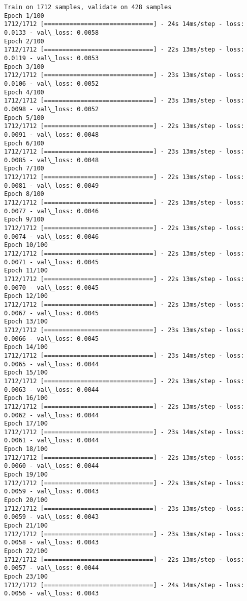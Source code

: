 \documentclass[11pt]{article}
\begin{document}
    \begin{Verbatim}[commandchars=\\\{\}]
Train on 1712 samples, validate on 428 samples
Epoch 1/100
1712/1712 [==============================] - 24s 14ms/step - loss: 0.0133 - val\_loss: 0.0058
Epoch 2/100
1712/1712 [==============================] - 22s 13ms/step - loss: 0.0119 - val\_loss: 0.0053
Epoch 3/100
1712/1712 [==============================] - 23s 13ms/step - loss: 0.0106 - val\_loss: 0.0052
Epoch 4/100
1712/1712 [==============================] - 23s 13ms/step - loss: 0.0098 - val\_loss: 0.0052
Epoch 5/100
1712/1712 [==============================] - 22s 13ms/step - loss: 0.0091 - val\_loss: 0.0048
Epoch 6/100
1712/1712 [==============================] - 23s 13ms/step - loss: 0.0085 - val\_loss: 0.0048
Epoch 7/100
1712/1712 [==============================] - 22s 13ms/step - loss: 0.0081 - val\_loss: 0.0049
Epoch 8/100
1712/1712 [==============================] - 22s 13ms/step - loss: 0.0077 - val\_loss: 0.0046
Epoch 9/100
1712/1712 [==============================] - 22s 13ms/step - loss: 0.0074 - val\_loss: 0.0046
Epoch 10/100
1712/1712 [==============================] - 22s 13ms/step - loss: 0.0071 - val\_loss: 0.0045
Epoch 11/100
1712/1712 [==============================] - 22s 13ms/step - loss: 0.0070 - val\_loss: 0.0045
Epoch 12/100
1712/1712 [==============================] - 22s 13ms/step - loss: 0.0067 - val\_loss: 0.0045
Epoch 13/100
1712/1712 [==============================] - 23s 13ms/step - loss: 0.0066 - val\_loss: 0.0045
Epoch 14/100
1712/1712 [==============================] - 23s 14ms/step - loss: 0.0065 - val\_loss: 0.0044
Epoch 15/100
1712/1712 [==============================] - 22s 13ms/step - loss: 0.0063 - val\_loss: 0.0044
Epoch 16/100
1712/1712 [==============================] - 22s 13ms/step - loss: 0.0062 - val\_loss: 0.0044
Epoch 17/100
1712/1712 [==============================] - 23s 14ms/step - loss: 0.0061 - val\_loss: 0.0044
Epoch 18/100
1712/1712 [==============================] - 22s 13ms/step - loss: 0.0060 - val\_loss: 0.0044
Epoch 19/100
1712/1712 [==============================] - 22s 13ms/step - loss: 0.0059 - val\_loss: 0.0043
Epoch 20/100
1712/1712 [==============================] - 23s 13ms/step - loss: 0.0059 - val\_loss: 0.0043
Epoch 21/100
1712/1712 [==============================] - 23s 13ms/step - loss: 0.0058 - val\_loss: 0.0043
Epoch 22/100
1712/1712 [==============================] - 22s 13ms/step - loss: 0.0057 - val\_loss: 0.0044
Epoch 23/100
1712/1712 [==============================] - 24s 14ms/step - loss: 0.0056 - val\_loss: 0.0043

\end{Verbatim}
\end{document}

